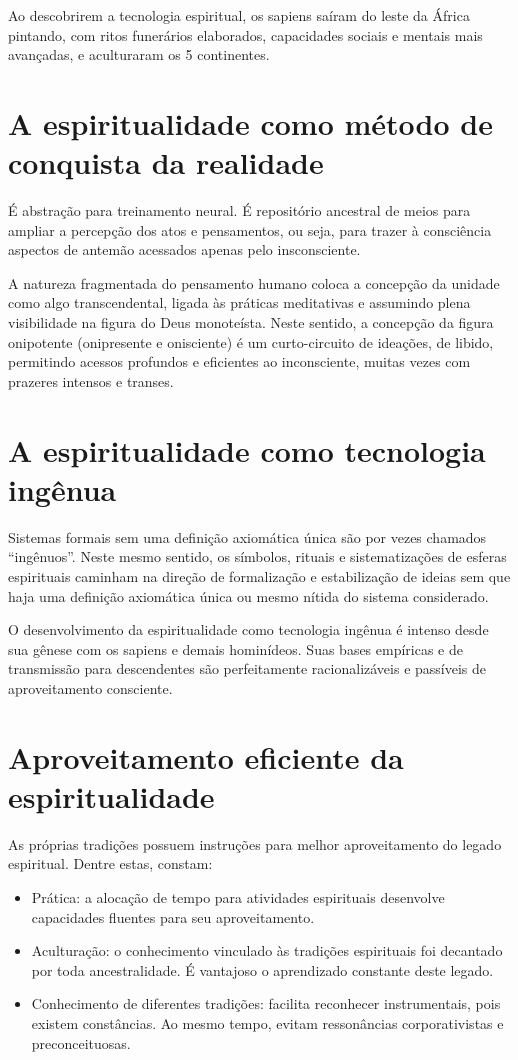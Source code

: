 \documentclass[a4paper]{article}
\begin{document}
Ao descobrirem a tecnologia espiritual, os sapiens
saíram do leste da África pintando,
com ritos funerários elaborados,
capacidades sociais e mentais mais avançadas,
e aculturaram os 5 continentes.

\section{A espiritualidade como método de conquista da realidade}\label{met}
É abstração para treinamento neural. É repositório ancestral de meios para ampliar a percepção dos atos e pensamentos, ou seja, para trazer à consciência aspectos de antemão acessados apenas pelo insconsciente.

A natureza fragmentada do pensamento humano coloca a concepção da unidade como algo transcendental, ligada às práticas meditativas e assumindo plena visibilidade na figura do Deus monoteísta. Neste sentido, a concepção da figura onipotente (onipresente e onisciente) é um curto-circuito de ideações, de libido, permitindo acessos profundos e eficientes ao inconsciente, muitas vezes com prazeres intensos e transes.

\section{A espiritualidade como tecnologia ingênua}
Sistemas formais sem uma definição axiomática única são por vezes chamados ``ingênuos''. Neste mesmo sentido, os símbolos, rituais e sistematizações de esferas espirituais caminham na direção de formalização e estabilização de ideias sem que haja uma definição axiomática única ou mesmo nítida do sistema considerado.

O desenvolvimento da espiritualidade como tecnologia ingênua é intenso desde sua gênese com os sapiens e demais hominídeos. Suas bases empíricas e de transmissão para descendentes são perfeitamente racionalizáveis e passíveis de aproveitamento consciente.

\section{Aproveitamento eficiente da espiritualidade}
As próprias tradições possuem instruções para melhor aproveitamento do legado espiritual. Dentre estas, constam:
\begin{itemize}
    \item Prática: a alocação de tempo para atividades espirituais desenvolve capacidades fluentes para seu aproveitamento.
    \item Aculturação: o conhecimento vinculado às tradições espirituais foi decantado por toda ancestralidade. É vantajoso o aprendizado constante deste legado.
    \item Conhecimento de diferentes tradições: facilita reconhecer instrumentais, pois existem constâncias. Ao mesmo tempo, evitam ressonâncias corporativistas e preconceituosas.
\end{itemize}
\end{document}
